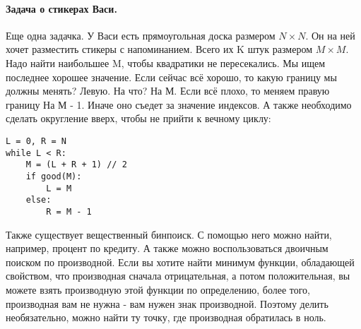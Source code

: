 \documentclass[a4paper,12pt]{article}
\begin{document}
\paragraph{Задача о стикерах Васи.}
Еще одна задачка. У Васи есть прямоугольная доска размером $N\times N$. Он на ней хочет разместить стикеры с напоминанием. Всего их K штук размером $M\times M$. Надо найти наибольшее M, чтобы квадратики не пересекались. Мы ищем последнее хорошее значение. Если сейчас всё хорошо, то какую границу мы должны менять? Левую. На что? На М. Если всё плохо, то меняем правую границу На М - 1. Иначе оно съедет за значение индексов. А также необходимо сделать округление вверх, чтобы не прийти к вечному циклу:
\begin{verbatim}
L = 0, R = N
while L < R:
    M = (L + R + 1) // 2
    if good(M):
        L = M
    else:
        R = M - 1
\end{verbatim}
Также существует вещественный бинпоиск. С помощью него можно найти, например, процент по кредиту. А также можно воспользоваться двоичным поиском по производной. Если вы хотите найти минимум функции, обладающей свойством, что производная сначала отрицательная, а потом положительная, вы можете взять производную этой функции по определению, более того, производная вам не нужна - вам нужен знак производной. Поэтому делить необязательно, можно найти ту точку, где производная обратилась в ноль. 
\end{document}
